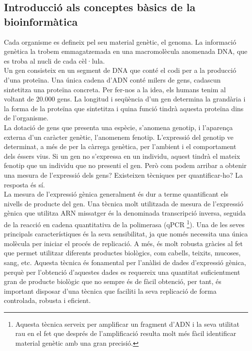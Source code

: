 \documentclass[english]{article}
\begin{document}
\subsection{Introducció als conceptes bàsics de la bioinformàtica}

Cada organisme es defineix pel seu material genètic, el genoma. La informació genètica la trobem emmagatzemada en una macromolècula anomenada DNA, que es troba al nucli de cada cèl·lula.
\\

Un gen consisteix en un segment de DNA que conté el codi per a la producció d'una proteïna. Una única cadena d'ADN conté milers de gens, cadascun sintetitza una proteïna concreta. Per fer-nos a la idea, els humans tenim al voltant de 20.000 gens. La longitud i seqüència d'un gen determina la grandària i la forma de la proteïna que sintetitza i quina funció tindrà aquesta proteïna dins de l'organisme.
\\

La dotació de gens que presenta una espècie, s'anomena genotip, i l'aparen\c{c}a externa d'un caràcter genètic, l'anomenem fenotip. L'expressió del genotip ve determinat, a més de per la càrrega genètica, per l'ambient i el comportament dels éssers vius. Si un gen no s'expressa en un individu, aquest tindrà el mateix fenotip que un individu que no presenti el gen. Però com podem arribar a obtenir una mesura de l'expressió dels gens? Existeixen tècniques per quantificar-ho? La resposta és sí.
\\

La mesura de l'expressió gènica generalment és dur a terme quantificant els nivells de producte del gen. Una tècnica molt utilitzada de mesura de l'expressió gènica que utilitza ARN missatger és la denominada transcripció inversa, seguida de la reacció en cadena quantitativa de la polimerasa (qPCR \footnote{Aquesta tècnica serveix per amplificar un fragment d'ADN i la seva utilitat rau en el fet que després de l'amplificació resulta molt més fàcil identificar material genètic amb una gran precisió.}). Una de les seves principals característiques és la seva sensibilitat, ja que només necessita una única molècula per iniciar el procés de replicació. A més, és molt robusta gràcies al fet que permet utilitzar diferents productes biològics, com cabells, teixits, mucoses, sang, etc. Aquesta tècnica és fonamental per l'anàlisi de dades d'expressió gènica, perquè per l'obtenció d'aquestes dades es requereix una quantitat suficientment gran de producte biològic que no sempre és de fàcil obtenció, per tant, és important disposar d'una tècnica que faciliti la seva replicació de forma controlada, robusta i eficient.
\\
\end{document}
